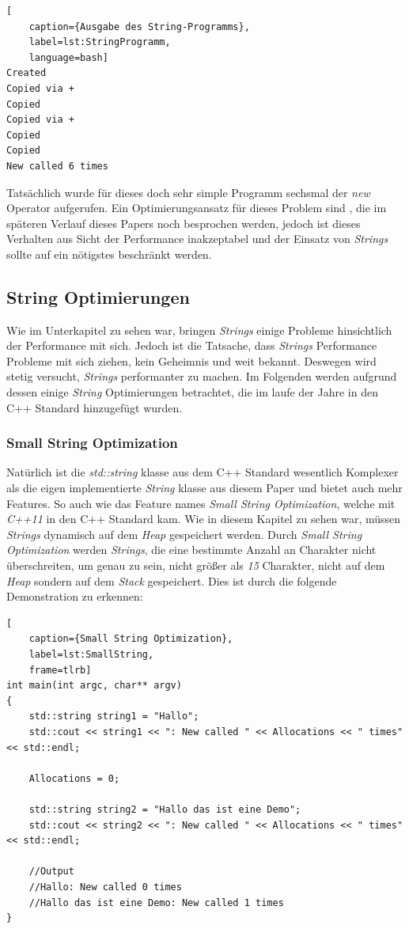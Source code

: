 \begin{lstlisting}[
    caption={Ausgabe des String-Programms},
    label=lst:StringProgramm,
    language=bash]
Created
Copied via +
Copied
Copied via +
Copied
Copied
New called 6 times
\end{lstlisting}

Tatsächlich wurde für dieses doch sehr simple Programm sechsmal der \emph{new} Operator
aufgerufen. Ein Optimierungsansatz für dieses Problem sind \emph{}, die im
späteren Verlauf dieses Papers noch besprochen werden, jedoch ist dieses Verhalten aus Sicht der
Performance inakzeptabel und der Einsatz von \emph{Strings} sollte auf ein nötigstes beschränkt
werden.

\subsection{String Optimierungen}
Wie im Unterkapitel \emph{} zu sehen war, bringen \emph{Strings}
einige Probleme hinsichtlich der Performance mit sich. Jedoch ist die Tatsache, dass
\emph{Strings} Performance Probleme mit sich ziehen, kein Geheimnis und weit bekannt. Deswegen
wird stetig versucht, \emph{Strings} performanter zu machen. Im Folgenden werden aufgrund dessen
einige \emph{String} Optimierungen betrachtet, die im laufe der Jahre in den C++ Standard
hinzugefügt wurden.
\newline
\subsubsection{Small String Optimization}
Natürlich ist die \emph{std::string} klasse aus dem C++ Standard wesentlich Komplexer als die
eigen implementierte \emph{String} klasse aus diesem Paper und bietet auch mehr Features. So auch
wie das Feature names \emph{Small String Optimization}, welche mit \emph{C++11} in den C++
Standard kam. Wie in diesem Kapitel zu sehen war, müssen \emph{Strings} dynamisch auf dem
\emph{Heap} gespeichert werden. Durch \emph{Small String Optimization} werden \emph{Strings}, die
eine bestimmte Anzahl an Charakter nicht überschreiten, um genau zu sein, nicht größer als \emph{15}
Charakter, nicht auf dem \emph{Heap} sondern auf dem \emph{Stack} gespeichert. Dies ist durch die
folgende Demonstration zu erkennen:

\begin{lstlisting}[
	caption={Small String Optimization},
	label=lst:SmallString,
	frame=tlrb]
int main(int argc, char** argv)
{
	std::string string1 = "Hallo";
	std::cout << string1 << ": New called " << Allocations << " times" << std::endl;

	Allocations = 0;

	std::string string2 = "Hallo das ist eine Demo";
	std::cout << string2 << ": New called " << Allocations << " times" << std::endl;

	//Output
	//Hallo: New called 0 times
	//Hallo das ist eine Demo: New called 1 times
}
\end{lstlisting}
\newline
